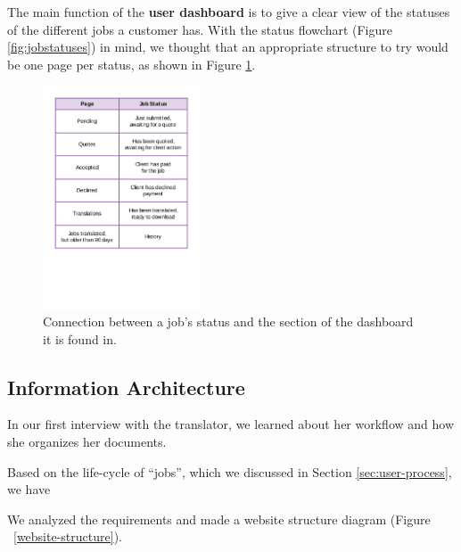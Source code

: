 \documentclass{l3proj}
\begin{document}
The main function of the \textbf{user dashboard} is to give a clear view of
the statuses of the different jobs a customer has. With the status flowchart
(Figure \ref{fig:jobstatuses}) in mind, we thought that an appropriate structure
to try would be one page per status, as shown in Figure 
\ref{fig:jobstatus-page}.

\begin{figure}[h]
\centering
\includegraphics[height=250px, trim = 0px 150px 0px 50px]{figures/jobstatus-page}
\caption{Connection between a job's status and the section of the dashboard it is
found in.}
\label{fig:jobstatus-page}
\end{figure}

\subsection{Information Architecture}
In our first interview with the translator, we learned about her workflow and
how she organizes her documents.

Based on the life-cycle of ``jobs'', which we discussed in Section
\ref{sec:user-process}, we have 

We analyzed the requirements and made a website structure diagram
(Figure ~\ref{website-structure}).
\end{document}
